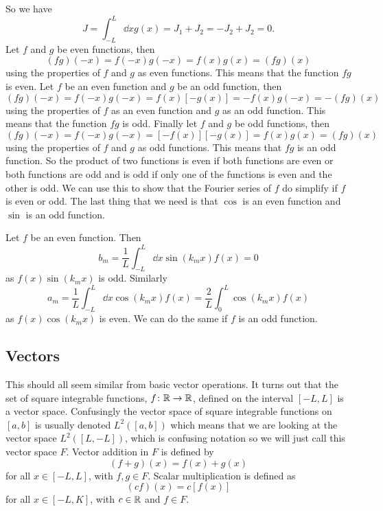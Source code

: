 \documentclass[a4paper]{article}
\begin{document}
    So we have
    \[J = \int_{-L}^{L} \dd{x} g(x) = J_1 + J_2 = -J_2 + J_2 = 0.\]
    Let \(f\) and \(g\) be even functions, then
    \[(fg)(-x) = f(-x)g(-x) = f(x)g(x) = (fg)(x)\]
    using the properties of \(f\) and \(g\) as even functions.
    This means that the function \(fg\) is even.
    Let \(f\) be an even function and \(g\) be an odd function, then
    \[(fg)(-x) = f(-x)g(-x) = f(x)[-g(x)] = -f(x)g(-x) = -(fg)(x)\]
    using the properties of \(f\) as an even function and \(g\) as an odd function.
    This means that the function \(fg\) is odd.
    Finally let \(f\) and \(g\) be odd functions, then
    \[(fg)(-x) = f(-x)g(-x) = [-f(x)][-g(x)] = f(x)g(x) = (fg)(x)\]
    using the properties of \(f\) and \(g\) as odd functions.
    This means that \(fg\) is an odd function.
    So the product of two functions is even if both functions are even or both functions are odd and is odd if only one of the functions is even and the other is odd.
    We can use this to show that the Fourier series of \(f\) do simplify if \(f\) is even or odd.
    The last thing that we need is that \(\cos\) is an even function and \(\sin\) is an odd function.
    
    Let \(f\) be an even function.
    Then
    \[b_m = \frac{1}{L}\int_{-L}^{L} \dd{x} \sin(k_mx)f(x) = 0\]
    as \(f(x)\sin(k_mx)\) is odd.
    Similarly
    \[a_m = \frac{1}{L}\int_{-L}^{L} \dd{x} \cos(k_mx)f(x) = \frac{2}{L}\int_{0}^{L} \cos(k_mx)f(x)\]
    as \(f(x)\cos(k_mx)\) is even.
    We can do the same if \(f\) is an odd function.
    
    \subsection{Vectors}\label{sec:vectors}
    This should all seem similar from basic vector operations.
    It turns out that the set of square integrable functions, \(f\colon\mathbb{R}\to\mathbb{R}\), defined on the interval \([-L, L]\) is a vector space. 
    Confusingly the vector space of square integrable functions on \([a, b]\) is usually denoted \(L^2([a, b])\) which means that we are looking at the vector space \(L^2([L, -L])\), which is confusing notation so we will just call this vector space \(F\). 
    Vector addition in \(F\) is defined by
    \[(f + g)(x) = f(x) + g(x)\]
    for all \(x\in[-L, L]\), with \(f, g\in F\).
    Scalar multiplication is defined as
    \[(cf)(x) = c[f(x)]\]
    for all \(x\in[-L, K]\), with \(c\in\mathbb{R}\) and \(f\in F\).
    
\end{document}
